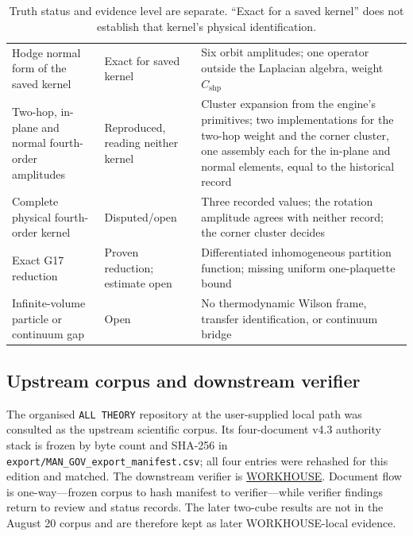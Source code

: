 \documentclass[11pt]{article}
\theoremstyle{plain}
\theoremstyle{definition}
\theoremstyle{remark}
\begin{document}
\begin{table}[ht]
\begin{tabular}{@{}>{\raggedright\arraybackslash}p{}
                    >{\raggedright\arraybackslash}p{}
                    >{\raggedright\arraybackslash}p{}@{}}
Hodge normal form of the saved kernel
 & Exact for saved kernel & Six orbit amplitudes; one operator outside the Laplacian algebra, weight $C_{\mathrm{shp}}$ \\
Two-hop, in-plane and normal fourth-order amplitudes
 & Reproduced, reading neither kernel & Cluster expansion from the engine's primitives; two implementations for the two-hop weight and the corner cluster, one assembly each for the in-plane and normal elements, equal to the historical record \\
Complete physical fourth-order kernel
 & Disputed/open & Three recorded values; the rotation amplitude agrees with neither record; the corner cluster decides \\
Exact G17 reduction
 & Proven reduction; estimate open & Differentiated inhomogeneous partition function; missing uniform one-plaquette bound \\
Infinite-volume particle or continuum gap
 & Open & No thermodynamic Wilson frame, transfer identification, or continuum bridge \\
\bottomrule
\end{tabular}
\caption{Truth status and evidence level are separate. ``Exact for a saved
kernel'' does not establish that kernel's physical identification.}
\label{tab:evidence}
\end{table}

\subsection{Upstream corpus and downstream verifier}

The organised \texttt{ALL THEORY} repository at the user-supplied local path was consulted as
the upstream scientific corpus. Its four-document v4.3 authority stack is
frozen by byte count and SHA-256 in
\nolinkurl{export/MAN_GOV_export_manifest.csv}; all four entries were
rehashed for this edition and matched. The downstream verifier is
\href{https://github.com/ats314/WORKHOUSE}{WORKHOUSE}. Document flow is
one-way---frozen corpus to hash manifest to verifier---while verifier findings
return to review and status records. The later two-cube results are not in the
August 20 corpus and are therefore kept as later WORKHOUSE-local evidence.
\end{document}
